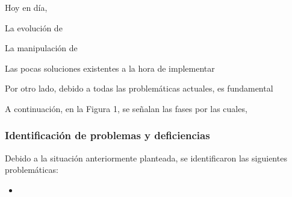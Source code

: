 Hoy en día,

La evolución de 

La manipulación de 

Las pocas soluciones existentes a la hora de implementar 

Por otro lado, debido a todas las problemáticas actuales,
es fundamental 

A continuación, en la Figura 1, se señalan las fases por las cuales,
%

\subsubsection{Identificación de problemas y deficiencias}
Debido a la situación anteriormente planteada,
se identificaron las siguientes problemáticas: 
\begin{itemize}
    \item 
\end{itemize}

